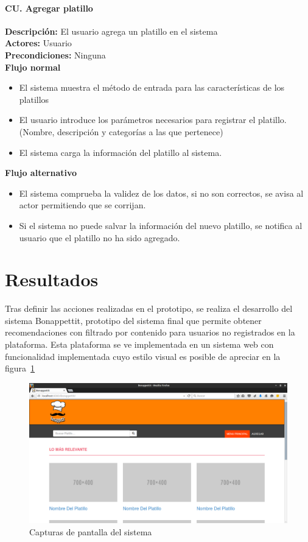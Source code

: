     \paragraph{CU. Agregar platillo\\}
    \textbf{Descripción:} El usuario agrega un platillo en el sistema\\
    \textbf{Actores:} Usuario\\
    \textbf{Precondiciones:} Ninguna\\
    \textbf{Flujo normal}\\
    \begin{itemize}
      \item El sistema muestra el método de entrada para las características de los platillos
      \item El usuario introduce los parámetros necesarios para registrar el platillo. (Nombre, descripción y categorías a las que pertenece)
      \item El sistema carga la información del platillo al sistema.
    \end{itemize}
    \textbf{Flujo alternativo}\\
    \begin{itemize}
      \item El sistema comprueba la validez de los datos, si no son correctos, se avisa al actor permitiendo que se corrijan. 
      \item Si el sistema no puede salvar la información del nuevo platillo, se notifica al usuario que el platillo no ha sido agregado.
    \end{itemize}
    
  \section{Resultados}
    Tras definir las acciones realizadas en el prototipo, se realiza el desarrollo del sistema Bonappettit, prototipo del sistema final que permite obtener recomendaciones con filtrado por contenido para usuarios no registrados en la plataforma. Esta plataforma se ve implementada en un sistema web con funcionalidad implementada cuyo estilo visual es posible de apreciar en la figura~\ref{fig: screenshot1 p2}
        \begin{figure}[h!]
          \centering
          \includegraphics[width=16cm]{./images/bonappettit.png}
          \caption{Capturas de pantalla del sistema}
          \label{fig: screenshot1 p2}
        \end{figure}

